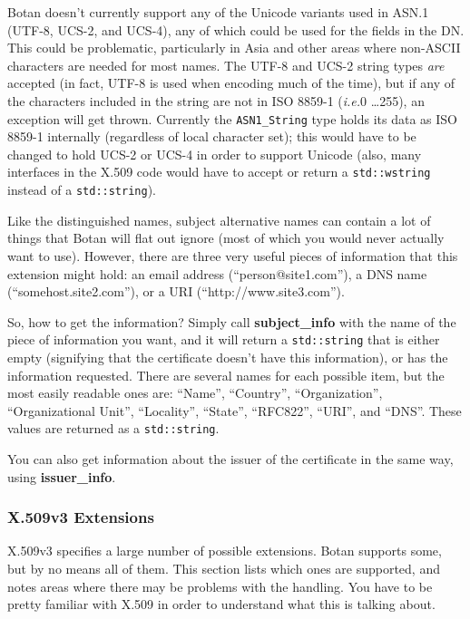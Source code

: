 \documentclass{article}
\newcommand{\function}[1]{\textbf{#1}}
\newcommand{\type}[1]{\texttt{#1}}
\newcommand{\ie}[0]{\emph{i.e.}}
\begin{document}
Botan doesn't currently support any of the Unicode variants used in ASN.1
(UTF-8, UCS-2, and UCS-4), any of which could be used for the fields in the
DN. This could be problematic, particularly in Asia and other areas where
non-ASCII characters are needed for most names. The UTF-8 and UCS-2 string
types \emph{are} accepted (in fact, UTF-8 is used when encoding much of the
time), but if any of the characters included in the string are not in ISO
8859-1 (\ie 0 \ldots 255), an exception will get thrown. Currently the
\type{ASN1\_String} type holds its data as ISO 8859-1 internally (regardless
of local character set); this would have to be changed to hold UCS-2 or UCS-4
in order to support Unicode (also, many interfaces in the X.509 code would have
to accept or return a \type{std::wstring} instead of a \type{std::string}).

Like the distinguished names, subject alternative names can contain a lot of
things that Botan will flat out ignore (most of which you would never actually
want to use). However, there are three very useful pieces of information that
this extension might hold: an email address (``person@site1.com''), a DNS name
(``somehost.site2.com''), or a URI (``http://www.site3.com'').

So, how to get the information? Simply call \function{subject\_info} with the
name of the piece of information you want, and it will return a
\type{std::string} that is either empty (signifying that the certificate
doesn't have this information), or has the information requested. There are
several names for each possible item, but the most easily readable ones are:
``Name'', ``Country'', ``Organization'', ``Organizational Unit'', ``Locality'',
``State'', ``RFC822'', ``URI'', and ``DNS''. These values are returned as a
\type{std::string}.

You can also get information about the issuer of the certificate in the same
way, using \function{issuer\_info}.

\subsubsection{X.509v3 Extensions}

X.509v3 specifies a large number of possible extensions. Botan supports some,
but by no means all of them. This section lists which ones are supported, and
notes areas where there may be problems with the handling. You have to be
pretty familiar with X.509 in order to understand what this is talking about.
\end{document}
